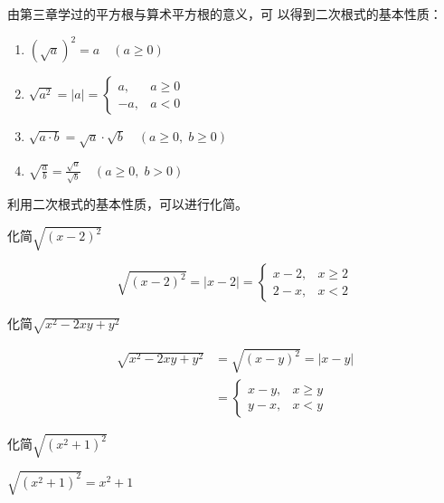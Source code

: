 由第三章学过的平方根与算术平方根的意义，可
以得到二次根式的基本性质：
\begin{blk}{}
    \begin{enumerate}
        \item $\left(\sqrt{a}\right)^2=a\quad (a\ge 0)$
        \item $\sqrt{a^2}=|a|=\begin{cases}
            a, & a\ge 0\\ -a, & a<0
        \end{cases}$
        \item $\sqrt{a\cdot b}=\sqrt{a}\cdot \sqrt{b}\quad (a\ge 0,\; b\ge 0)$
        \item $\sqrt{\frac{a}{b}}=\frac{\sqrt{a}}{\sqrt{b}}\quad (a\ge 0,\; b>0)$
    \end{enumerate}
\end{blk}

利用二次根式的基本性质，可以进行化简。


\begin{example}
    化简$\sqrt{(x-2)^2}$
\end{example}

\begin{solution}
    \[\sqrt{(x-2)^2}=|x-2|=\begin{cases}
        x-2, & x\ge2\\ 2-x, & x<2
    \end{cases}\]
\end{solution}



\begin{example}
化简$\sqrt{x^2-2xy+y^2}$    
\end{example}

\begin{solution}
    \[\begin{split}
\sqrt{x^2-2xy+y^2}&=\sqrt{(x-y)^2}=|x-y|\\
&=\begin{cases}
    x-y, & x\ge y\\
    y-x, & x<y
\end{cases}
    \end{split}\]
\end{solution}

\begin{example}
    化简$\sqrt{(x^2+1)^2}$
\end{example}

\begin{solution}
    $\sqrt{(x^2+1)^2}=x^2+1$
\end{solution}

